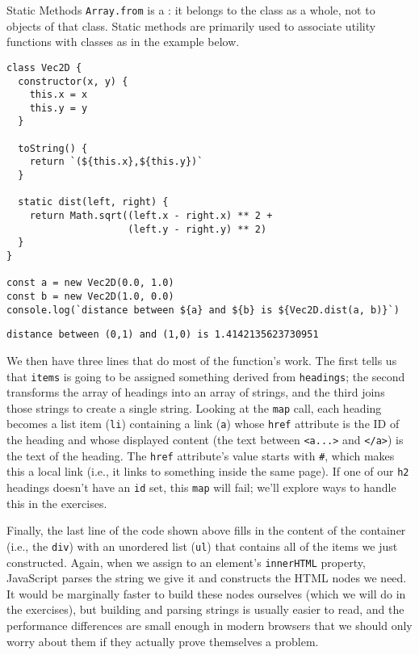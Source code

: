 \begin{aside}{Static Methods}
  \texttt{Array.from} is a :
  it belongs to the class as a whole,
  not to objects of that class.
  Static methods are primarily used to associate utility functions with classes
  as in the example below.

\begin{verbatim}
class Vec2D {
  constructor(x, y) {
    this.x = x
    this.y = y
  }

  toString() {
    return `(${this.x},${this.y})`
  }

  static dist(left, right) {
    return Math.sqrt((left.x - right.x) ** 2 +
                     (left.y - right.y) ** 2)
  }
}

const a = new Vec2D(0.0, 1.0)
const b = new Vec2D(1.0, 0.0)
console.log(`distance between ${a} and ${b} is ${Vec2D.dist(a, b)}`)
\end{verbatim}

\begin{verbatim}
distance between (0,1) and (1,0) is 1.4142135623730951
\end{verbatim}
\end{aside}

We then have three lines that do most of the function's work.
The first tells us that \texttt{items} is going to be assigned
something derived from \texttt{headings};
the second transforms the array of headings into an array of strings,
and the third joins those strings to create a single string.
Looking at the \texttt{map} call,
each heading becomes a list item (\texttt{li})
containing a link (\texttt{a})
whose \texttt{href} attribute is the ID of the heading
and whose displayed content (the text between \texttt{{\textless}a...{\textgreater}{}} and \texttt{{\textless}/a{\textgreater}{}})
is the text of the heading.
The \texttt{href} attribute's value starts with \texttt{\#},
which makes this a local link
(i.e., it links to something inside the same page).
If one of our \texttt{h2} headings doesn't have an \texttt{id} set,
this \texttt{map} will fail;
we'll explore ways to handle this in the exercises.

Finally,
the last line of the code shown above
fills in the content of the container (i.e., the \texttt{div})
with an unordered list (\texttt{ul})
that contains all of the items we just constructed.
Again,
when we assign to an element's \texttt{innerHTML} property,
JavaScript parses the string we give it
and constructs the HTML nodes we need.
It would be marginally faster to build these nodes ourselves
(which we will do in the exercises),
but building and parsing strings is usually easier to read,
and the performance differences are small enough in modern browsers
that we should only worry about them if they actually prove themselves a problem.

